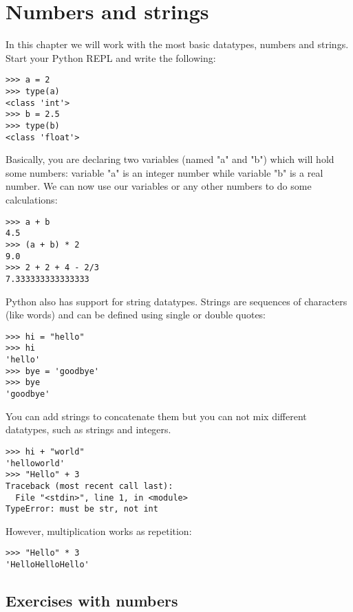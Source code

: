 \chapter{Numbers and strings}\label{basic-datatypes}

In this chapter we will work with the most basic datatypes, numbers and strings. Start your Python REPL and write the following:

\begin{lstlisting}
>>> a = 2
>>> type(a)
<class 'int'>
>>> b = 2.5
>>> type(b)
<class 'float'>
\end{lstlisting}

Basically, you are declaring two variables (named "a" and "b") which will hold some numbers: variable "a" is an integer number while variable "b" is a real number. We can now use our variables or any other numbers to do some calculations:

\begin{lstlisting}
>>> a + b
4.5
>>> (a + b) * 2
9.0
>>> 2 + 2 + 4 - 2/3
7.333333333333333
\end{lstlisting}

Python also has support for string datatypes. Strings are sequences of characters (like words) and can be defined using single or double quotes:

\begin{lstlisting}
>>> hi = "hello"
>>> hi
'hello'
>>> bye = 'goodbye'
>>> bye
'goodbye'
\end{lstlisting}

You can add strings to concatenate them but you can not mix different datatypes, such as strings and integers.

\begin{lstlisting}
>>> hi + "world"
'helloworld'
>>> "Hello" + 3
Traceback (most recent call last):
  File "<stdin>", line 1, in <module>
TypeError: must be str, not int
\end{lstlisting}

However, multiplication works as repetition:

\begin{lstlisting}
>>> "Hello" * 3
'HelloHelloHello'
\end{lstlisting}


\section{Exercises with numbers}


